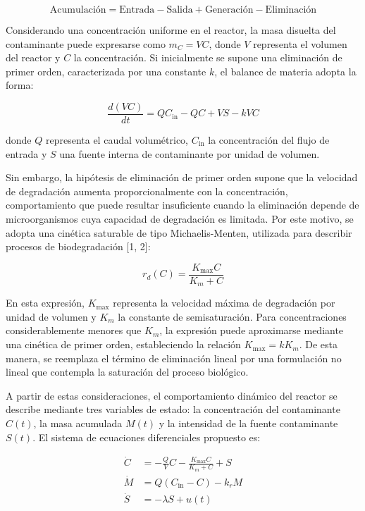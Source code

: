 \documentclass[11pt]{article}
\begin{document}
\[
\boxed{\text{Acumulación}=\text{Entrada}-\text{Salida}+\text{Generación}-\text{Eliminación}}
\tag{1}
\]

Considerando una concentración uniforme en el reactor, la masa disuelta
del contaminante puede expresarse como \(m_C=VC\), donde \(V\)
representa el volumen del reactor y \(C\) la concentración. Si
inicialmente se supone una eliminación de primer orden, caracterizada
por una constante \(k\), el balance de materia adopta la forma:

\[
\frac{d(VC)}{dt}=QC_{\mathrm{in}}-QC+VS-kVC
\tag{2}
\]

donde \(Q\) representa el caudal volumétrico, \(C_{\mathrm{in}}\) la
concentración del flujo de entrada y \(S\) una fuente interna de
contaminante por unidad de volumen.

Sin embargo, la hipótesis de eliminación de primer orden supone que la
velocidad de degradación aumenta proporcionalmente con la concentración,
comportamiento que puede resultar insuficiente cuando la eliminación
depende de microorganismos cuya capacidad de degradación es limitada.
Por este motivo, se adopta una cinética saturable de tipo
Michaelis-Menten, utilizada para describir procesos de biodegradación
{[}1, 2{]}:

\[
r_d(C)=\frac{K_{\max}C}{K_m+C}
\tag{3}
\]

En esta expresión, \(K_{\max}\) representa la velocidad máxima de
degradación por unidad de volumen y \(K_m\) la constante de
semisaturación. Para concentraciones considerablemente menores que
\(K_m\), la expresión puede aproximarse mediante una cinética de primer
orden, estableciendo la relación \(K_{\max}=kK_m\). De esta manera, se
reemplaza el término de eliminación lineal por una formulación no lineal
que contempla la saturación del proceso biológico.

A partir de estas consideraciones, el comportamiento dinámico del
reactor se describe mediante tres variables de estado: la concentración
del contaminante \(C(t)\), la masa acumulada \(M(t)\) y la intensidad de
la fuente contaminante \(S(t)\). El sistema de ecuaciones diferenciales
propuesto es:

\[
\begin{aligned}
\dot C &= -\frac{Q}{V}C-\frac{K_{\max}C}{K_m+C}+S\\[6pt]
\dot M &= Q(C_{\mathrm{in}}-C)-k_rM\\[6pt]
\dot S &= -\lambda S+u(t)
\end{aligned}
\tag{4}
\]
\end{document}
